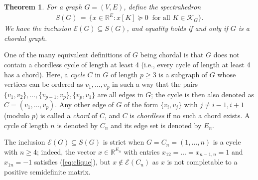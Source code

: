 \documentclass[a4paper, 11pt, twoside]{article}
\newcommand{\R}{\mathbb{R}}
\newcommand{\ME}{{\mathcal E}}
\newcommand{\MK}{{\mathcal K}}
\theoremstyle{plain}
\newtheorem{theorem}{Theorem}[section]
\begin{document}
\begin{theorem}
\label{theo:chordal}\cite{GJSW_1984}
For a graph $G=(V,E)$, define the spectrahedron
\begin{align}\label{eq:SG}
S(G)\, =\, \{x\in\R^E: x[K]\succeq 0\ \text{ for all } K\in \MK_G\}.
\end{align}
We have the inclusion $\ME(G)\subseteq S(G)$, and equality holds if and only if $G$ is a chordal graph.
\end{theorem}


One of the many equivalent definitions of $G$ being chordal   is that $G$ does not contain a chordless cycle of length at least 4 (i.e., every cycle  of length at least 4 has a chord).  Here, a {\em cycle} $C$ in $G$ of length $p\ge 3$ is a subgraph of $G$ whose vertices  can be ordered as $v_1,\ldots, v_p$ in such a way that the pairs $\{v_1,v_2\},\ldots,\{v_{p-1},v_p\}, \{v_p,v_1\}$ are all edges in $G$; the cycle is then also denoted as $C=(v_1,\ldots,v_p)$. Any other edge of $G$ of the form $\{v_i,v_j\}$ with $j\ne i-1,i+1$ (modulo $p$) is called a {\em chord} of $C$, and $C$ is {\em chordless} if no such a chord exists. A cycle of length $n$ is denoted by $C_n$ and its edge set is denoted by $E_n$.


The inclusion $\ME(G)\subseteq S(G)$ is strict when $G=C_n=(1,\ldots,n)$ is a cycle with $n \ge 4$; indeed, the vector $x\in\R^{E_n}$ with entries $x_{12}=\ldots=x_{n-1,n}=1$ and $x_{1n}=-1$ satisfies (\ref{eq:clique}), but $x\not\in \ME(C_n)$  as $x$  is not completable to a positive semidefinite matrix.
\end{document}
